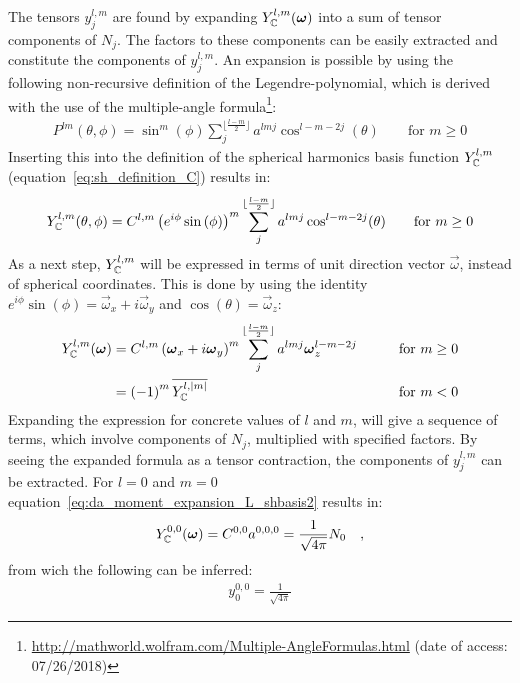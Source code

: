The tensors $y^{l,m}_j$ are found by expanding $Y_{\mathbb{C}}^{l,m}(\boldsymbol{\mathbf{\omega}})$ into a sum of tensor components of $N_j$. The factors to these components can be easily extracted and constitute the components of $y^{l,m}_j$. An expansion is possible by using the following non-recursive definition of the Legendre-polynomial, which is derived with the use of the multiple-angle formula\footnote{\url{http://mathworld.wolfram.com/Multiple-AngleFormulas.html} (date of access: 07/26/2018)}:
\begin{align}
P^{lm}(\theta, \phi) = \operatorname{sin}^m(\phi)\sum_j^{\lfloor\frac{l-m}{2}\rfloor}a^{lmj}\operatorname{cos}^{l-m-2j}(\theta)
\qquad \text{for } m \ge 0
\end{align}
Inserting this into the definition of the spherical harmonics basis function $Y_{\mathbb{C}}^{l,m}$ (equation~\ref{eq:sh_definition_C}) results in:
\begin{align}
Y_{\mathbb{C}}^{l,m}(\theta, \phi) = C^{l,m}\left(e^{i\phi}\operatorname{sin}\left(\phi\right)\right)^m \sum_j^{\lfloor\frac{l-m}{2}\rfloor}a^{lmj}\operatorname{cos}^{l-m-2j}(\theta)
\qquad \text{for } m \ge 0
\end{align}
As a next step, $Y_{\mathbb{C}}^{l,m}$ will be expressed in terms of unit direction vector $\vec{\omega}$, instead of spherical coordinates. This is done by using the identity $e^{i\phi}\operatorname{sin}\left(\phi\right) = \vec{\omega}_x + i\vec{\omega}_y$ and $\operatorname{cos}(\theta) = \vec{\omega}_z$:
\begin{align}
Y_{\mathbb{C}}^{l,m}(\boldsymbol{\mathbf{\omega}}) &=  C^{l,m}\left( \boldsymbol{\mathbf{\omega}}_x + i\boldsymbol{\mathbf{\omega}}_y\right)^m \sum_j^{\lfloor\frac{l-m}{2}\rfloor}a^{lmj}\boldsymbol{\mathbf{\omega}}_z^{l-m-2j}
&\qquad \text{for } m \ge 0
\label{eq:da_moment_expansion_L_shbasis2}
\\
&= \left(-1\right)^m\overline{Y_{\mathbb{C}}^{l,\left\vert m\right\vert}}
&\qquad \text{for } m < 0
\end{align}
Expanding the expression for concrete values of $l$ and $m$, will give a sequence of terms, which involve components of $N_j$, multiplied with specified factors. By seeing the expanded formula as a tensor contraction, the components of $y^{l,m}_j$ can be extracted. For $l=0$ and $m=0$ equation~\ref{eq:da_moment_expansion_L_shbasis2} results in:
\begin{align}
Y_{\mathbb{C}}^{0,0}(\boldsymbol{\mathbf{\omega}}) = C^{{0,0}}a^{{0,0,0}} = \frac{1}{\sqrt{4\pi}}N_0\quad,
\end{align}
from wich the following can be inferred:
\begin{align}
y^{0,0}_0 = \frac{1}{\sqrt{4\pi}}
\end{align}
